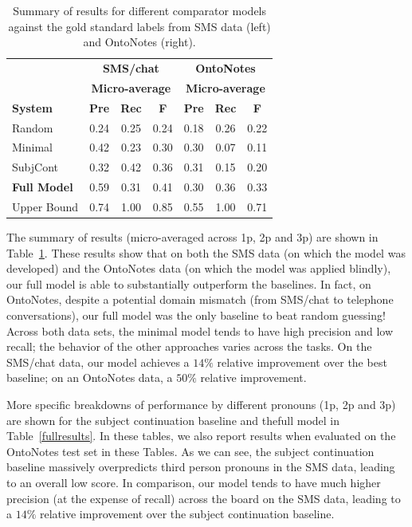 \documentclass[11pt]{report}
\begin{document}
\begin{table}[t]
\begin{footnotesize}
\begin{center}
\begin{tabular}{|l|c|c|c|c|c|c|}
\hline
                         & \multicolumn{3}{c|}{\bf SMS/chat}                          & \multicolumn{3}{c|}{\bf OntoNotes} \\
                         & \multicolumn{3}{c|}{\bf Micro-average}                 & \multicolumn{3}{c|}{\bf Micro-average} \\
\bf System               & \bf Pre & \bf Rec & \bf F & \bf Pre & \bf Rec & \bf F \\
\hline
    Random       & 0.24    & 0.25    & 0.24  & 0.18    & 0.26    & 0.22    \\
    Minimal         & 0.42    & 0.23    & 0.30  & 0.30    & 0.07    & 0.11    \\
    SubjCont & 0.32    & 0.42    & 0.36  & 0.31    & 0.15    & 0.20    \\
\bf Full Model           & 0.59    & 0.31    & 0.41  & 0.30    & 0.36    & 0.33    \\
    Upper Bound          & 0.74    & 1.00    & 0.85  & 0.55    & 1.00    & 0.71    \\
\hline
\end{tabular}
\end{center}
\end{footnotesize}
\caption{\label{summary-results} Summary of results for different comparator models against the gold standard labels from SMS data (left) and OntoNotes (right).}
\end{table}

The summary of results (micro-averaged across 1p, 2p and 3p) are shown in Table~\ref{summary-results}. These results show that on both the SMS data (on which the model was developed) and the OntoNotes data (on which the model was applied blindly), our full model is able to substantially outperform the baselines. In fact, on OntoNotes, despite a potential domain mismatch (from SMS/chat to telephone conversations), our full model was the only baseline to beat random guessing! Across both data sets, the minimal model tends to have high precision and low recall; the behavior of the other approaches varies across the tasks. On the SMS/chat data, our model achieves a $14\%$ relative improvement over the best baseline; on an OntoNotes data, a $50\%$ relative improvement.

More specific breakdowns of performance by different pronouns (1p, 2p and 3p) are shown for the subject continuation baseline and thefull model in Table~\ref{fullresults}. In these tables, we also report results when evaluated on the OntoNotes test set in these Tables. As we can see, the subject continuation baseline massively overpredicts third person pronouns in the SMS data, leading to an overall low score. In comparison, our model tends to have much higher precision (at the expense of recall) across the board on the SMS data, leading to a $14\%$ relative improvement over the subject continuation baseline.
\end{document}
